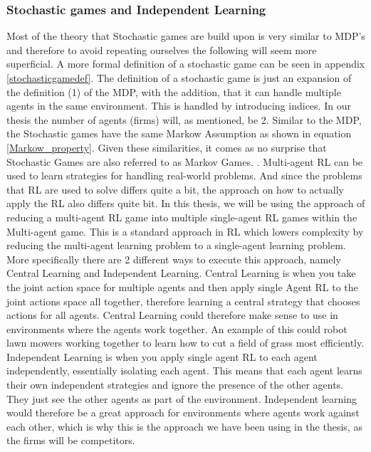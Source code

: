 \documentclass{article}
\begin{document}
\subsubsection{Stochastic games and Independent Learning}
Most of the theory that Stochastic games are build upon is very similar to MDP's and therefore to avoid repeating ourselves the following will seem more superficial. A more formal definition of a stochastic game can be seen in appendix \ref{stochasticgamedef}. 
\newline
The definition of a stochastic game is just an expansion of the definition (1) of the MDP, with the addition, that it can handle multiple agents in the same environment. This is handled by introducing indices. In our thesis the number of agents (firms) will, as mentioned, be 2. Similar to the MDP, the Stochastic games have the same Markow Assumption as shown in equation \ref{Markow_property}. Given these similarities, it comes as no surprise that Stochastic Games are also referred to as Markov Games. \citep[p. 48]{marl-book}.
\newline 
\newline
Multi-agent RL can be used to learn strategies for handling real-world problems. And since the problems that RL are used to solve differs quite a bit, the approach on how to actually apply the RL also differs quite bit. In this thesis, we will be using the approach of reducing 
a multi-agent RL game into multiple single-agent RL games within the Multi-agent game. This is a standard approach in RL which lowers complexity by reducing the multi-agent learning problem to a single-agent learning problem. More specifically there are 2 different ways to execute this approach, namely Central Learning and Independent Learning. Central Learning is when you take the joint action space for multiple agents and then apply single Agent RL to the joint actions space all together, therefore learning a central strategy that chooses actions for all agents. Central Learning could therefore make sense to use in environments where the agents work together. An example of this could robot lawn mowers working together to learn how to cut a field of grass most efficiently. Independent Learning is when you apply single agent RL to each agent independently, essentially isolating each agent. This means that each agent learns their own independent strategies and ignore the presence of the other agents\citep[p. 95]{marl-book}. They just see the other agents as part of the environment. Independent learning would therefore be a great approach for environments where agents work against each other, which is why this is the approach we have been using in the thesis, as the firms will be competitors. 
\end{document}
